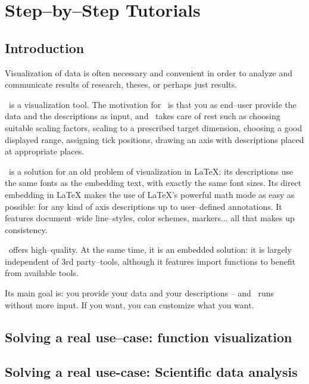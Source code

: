 
\chapter{Step--by--Step Tutorials}

\section{Introduction}
Visualization of data is often necessary and convenient in order to analyze and communicate results of research, theses, or perhaps just results.

\PGFPlots\ is a visualization tool. The motivation for \PGFPlots\ is that you as end--user provide the data and the descriptions as input, and \PGFPlots\ takes care of rest such as choosing suitable scaling factors, scaling to a prescribed target dimension, choosing a good displayed range, assigning tick positions, drawing an axis with descriptions placed at appropriate places.

\PGFPlots\ is a solution for an old problem of visualization in LaTeX: its descriptions use the same fonts as the embedding text, with exactly the same font sizes. Its direct embedding in LaTeX makes the use of LaTeX's powerful math mode as easy as possible: for any kind of axis descriptions up to user--defined annotations. It features document--wide line--styles, color schemes, markers... all that makes up consistency. 

\PGFPlots\ offers high--quality. At the same time, it is an embedded solution: it is largely independent of 3rd party--tools, although it features import functions to benefit from available tools.

Its main goal is: you provide your data and your descriptions -- and \PGFPlots\ runs without more input. If you want, you can customize what you want.

\section{Solving a real use--case: function visualization}



\section{Solving a real use-case: Scientific data analysis}



\endinput
